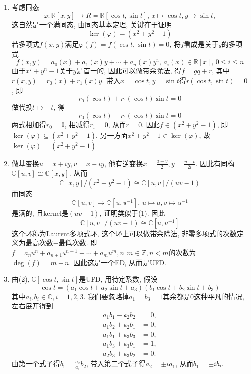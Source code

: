 \documentclass[UTF8,fontset=windows]{ctexart}
\newenvironment{solution}
{\begin{tcolorbox}[colback=blue!10, colframe=blue!50, title=\textit{proof}, breakable]}
{\end{tcolorbox}}
\begin{document}
\begin{solution}
\begin{enumerate}[(1)]
    \item 考虑同态
    \[
        \varphi: \mathbb{R}[x, y] \to R = \mathbb{R}[\cos t, \sin t],\, x \mapsto \cos t, y \mapsto \sin t,
    \]
    这自然是一个满同态, 由同态基本定理, 关键在于证明
    \[
        \ker(\varphi) = (x^2 + y^2 - 1)
    \]
    若多项式$f(x, y)$满足$\varphi(f) = f(\cos t, \sin t) = 0$, 将$f$看成是关于$y$的多项式
    \[
        f(x, y) = a_0(x) + a_1(x)y + \cdots + a_n(x)y^n,\, a_i(x) \in \mathbb{R}[x],\, 0 \leqslant i \leqslant n
    \]
    由于$x^2 + y^n - 1$关于$y$是首一的, 因此可以做带余除法, 得$f = gq + r$, 其中$r(x, y) = r_0(x) + r_1(x)y$. 带入$x = \cos t, y = \sin t$得$r(\cos t, \sin t) = 0$, 即
    \[
        r_0(\cos t) + r_1(\cos t)\sin t = 0
    \]
    做代换$t \mapsto -t$, 得
    \[
        r_0(\cos t) - r_1(\cos t)\sin t = 0
    \]
    两式相加得$r_0 = 0$, 相减得$r_1 = 0$, 从而$r = 0$. 因此$f \in (x^2 + y^2 - 1)$, 即$\ker(\varphi) \subseteq (x^2 + y^2 - 1)$. 另一方面$x^2 + y^2 - 1 \in \ker(\varphi)$, 故$\ker(\varphi) = (x^2 + y^2 - 1)$
    \item 做基变换$u = x + iy, v = x - iy$, 他有逆变换$x = \frac{u + v}{2}, y = \frac{u - v}{2i}$. 因此有同构$\mathbb{C}[u, v] \cong \mathbb{C}[x, y]$. 从而
    \[
        \mathbb{C}[x, y]/(x^2 + y^2 - 1) \cong \mathbb{C}[u, v]/(uv - 1)
    \]
    而同态
    \[
        \mathbb{C}[u, v] \to \mathbb{C}[u, u^{-1}],\, u \mapsto u, v \mapsto u^{-1}
    \]
    是满的, 且kernel是$(uv - 1)$, 证明类似于(1). 因此
    \[
        \mathbb{C}[u, v]/(uv - 1) \cong \mathbb{C}[u, u^{-1}]
    \]
    这个环称为Laurent多项式环, 这个环上可以做带余除法, 非零多项式的次数定义为最高次数$-$最低次数. 即$f = a_nu^n + a_{n + 1}u^{n + 1} + \cdots + a_mu^m, n, m \in \mathbb{Z}, n < m$的次数为$\deg(f) = m - n$.
    因此这是一个ED, 从而是UFD.
    \item 由(2), $\mathbb{C}[\cos t, \sin t]$是UFD, 用待定系数, 假设
    \[
        \cos t = (a_1\cos t + a_2\sin t + a_3)(b_1\cos t + b_2\sin t + b_3)
    \]
    其中$a_i, b_i \in \mathbb{C}, i = 1, 2, 3$. 我们要忽略掉$a_1 = b_3 = 1$其余都是$0$这种平凡的情况, 左右展开得到
    \[
        \begin{aligned}
            a_1b_1 - a_2b_2 &= 0,\\
            a_1b_2 + a_2b_1 &= 0,\\
            a_1b_1 + a_3b_3 &= 0,\\
            a_1b_3 + a_3b_1 &= 1,\\
            a_2b_3 + a_3b_2 &= 0.
        \end{aligned}
    \]
    由第一个式子得$b_1 = \frac{a_2}{a_1}b_2$, 带入第二个式子得$a_2 = \pm ia_1$, 从而$b_1 = \pm ib_2$.
    

\end{enumerate}
\end{solution}
\end{document}
